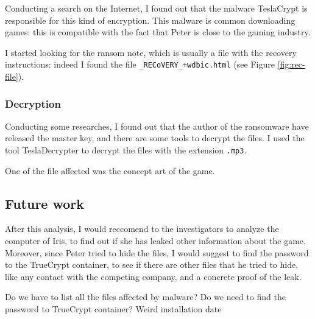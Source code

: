 \documentclass[12pt]{article}
\begin{document}
Conducting a search on the Internet, I found out that the malware TeslaCrypt is responsible for this kind of encryption. This malware is common downloading games: this is compatible with the fact that Peter is close to the gaming industry.

I started looking for the ransom note, which is usually a file with the recovery instructions: indeed I found the file \texttt{\_RECoVERY\_+wdbic.html} (see Figure \ref{fig:rec-file}).

\subsubsection{Decryption}
Conducting some researches, I found out that the author of the ransomware have released the master key, and there are some tools to decrypt the files. I used the tool TeslaDecrypter \cite{tesla-decrypt} to decrypt the files with the extension \texttt{.mp3}.

One of the file affected was the concept art of the game.

\subsection{Future work}

After this analysis, I would reccomend to the investigators to analyze the computer of Iris, to find out if she has leaked other information about the game. Moreover, since Peter tried to hide the files, I would suggest to find the password to the TrueCrypt container, to see if there are other files that he tried to hide, like any contact with the competing company, and a concrete proof of the leak.


Do we have to list all the files affected by malware?
Do we need to find the password to TrueCrypt container?
Weird installation date

\printbibliography[title={Sources}]
\end{document}
